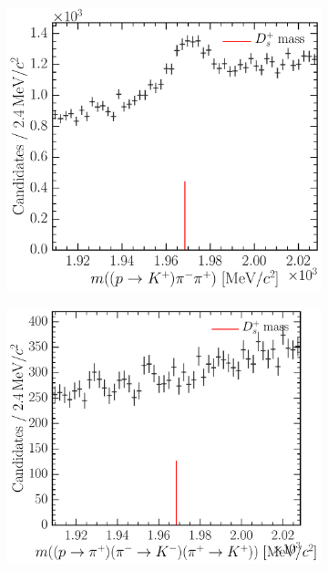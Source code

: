 \begin{figure}
\begin{subfigure}[b]{0.3\textwidth}
    \caption{\decay{\PDsplus}{\PKplus\PKminus\PKplus}}
    \label{fig:cpv:selection:background_study:ppipi_meson:dsplus_kkk}
  \end{subfigure}
  \begin{subfigure}[b]{0.3\textwidth}
    \includegraphics[width=\textwidth]{figures/cpv/selection/background_study/ppipi/LcToppipi_2012_MagDown_Ds_ppTokp_pim_pip}
    \caption{\decay{\PDsplus}{\PKplus\Ppiminus\Ppiplus}}
    \label{fig:cpv:selection:background_study:ppipi_meson:dsplus_kpipi}
  \end{subfigure}
  \begin{subfigure}[b]{0.3\textwidth}
    \includegraphics[width=\textwidth]{figures/cpv/selection/background_study/ppipi/LcToppipi_2012_MagDown_Ds_ppTopip_pimTokm_pipTokp}

\end{subfigure}
\end{figure}
